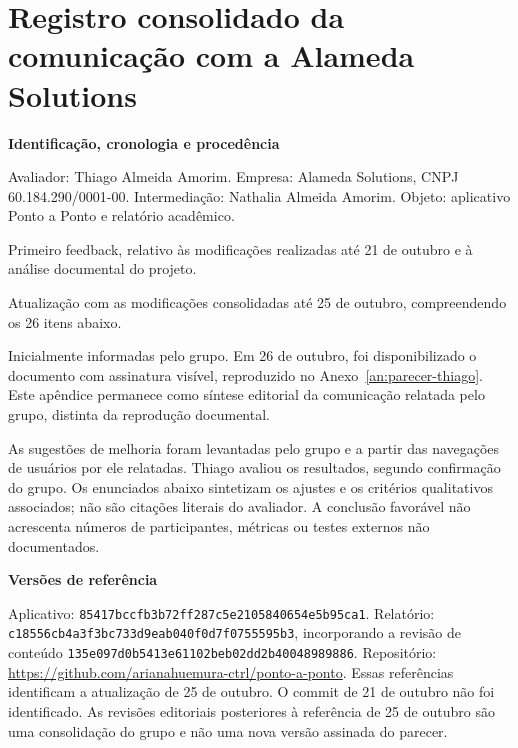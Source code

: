 \chapter[Comunicação com a Alameda Solutions]{Registro consolidado da comunicação com a Alameda Solutions}\label{ap:feedback-alameda}
\begingroup\setlength{\parskip}{6pt}
\par{}\medskip\noindent\textbf{Identificação, cronologia e procedência}\par

Avaliador: Thiago Almeida Amorim. Empresa: Alameda Solutions, CNPJ 60.184.290/0001-00. Intermediação: Nathalia Almeida Amorim. Objeto: aplicativo Ponto a Ponto e relatório acadêmico.

\begin{description}[itemsep=2pt,parsep=0pt,topsep=4pt]
\item[21/10/2026:] Primeiro feedback, relativo às modificações realizadas até 21 de outubro e à análise documental do projeto.
\item[25/10/2026:] Atualização com as modificações consolidadas até 25 de outubro, compreendendo os 26 itens abaixo.
\item[Confirmação e assinatura:] Inicialmente informadas pelo grupo. Em 26 de outubro, foi disponibilizado o documento com assinatura visível, reproduzido no Anexo~\ref{an:parecer-thiago}. Este apêndice permanece como síntese editorial da comunicação relatada pelo grupo, distinta da reprodução documental.
\end{description}

As sugestões de melhoria foram levantadas pelo grupo e a partir das navegações de usuários por ele relatadas. Thiago avaliou os resultados, segundo confirmação do grupo. Os enunciados abaixo sintetizam os ajustes e os critérios qualitativos associados; não são citações literais do avaliador. A conclusão favorável não acrescenta números de participantes, métricas ou testes externos não documentados.

\par{}\medskip\noindent\textbf{Versões de referência}\par

Aplicativo: \nolinkurl{85417bccfb3b72ff287c5e2105840654e5b95ca1}. Relatório: \nolinkurl{c18556cb4a3f3bc733d9eab040f0d7f0755595b3}, incorporando a revisão de conteúdo \nolinkurl{135e097d0b5413e61102beb02dd2b40048989886}. Repositório: \url{https://github.com/arianahuemura-ctrl/ponto-a-ponto}. Essas referências identificam a atualização de 25 de outubro. O commit de 21 de outubro não foi identificado. As revisões editoriais posteriores à referência de 25 de outubro são uma consolidação do grupo e não uma nova versão assinada do parecer.


